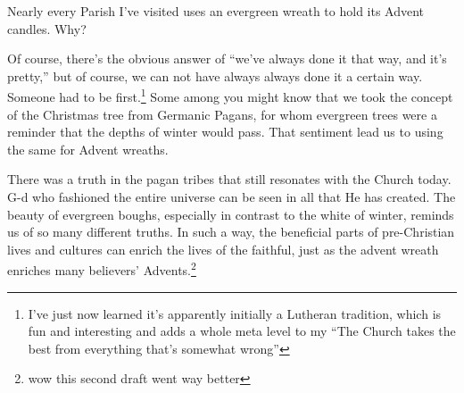 \documentclass[12pt]{article}[titlepage]
\newcommand{\say}[1]{``#1''}
\newcommand{\1}{\={a}}
\newcommand{\2}{\={e}}
\newcommand{\3}{\={\i}}
\newcommand{\4}{\=o}
\newcommand{\5}{\=u}
\newcommand{\6}{\={A}}
\renewcommand{\,}{\textsuperscript{,}}
\begin{document}
Nearly every Parish I've visited uses an evergreen wreath to hold its Advent candles.
Why?

Of course, there's the obvious answer of \say{we've always done it that way, and it's pretty,} but of course, we can not have always always done it a certain way.
Someone had to be first.\footnote{I've just now learned it's apparently initially a Lutheran tradition, which is fun and interesting and adds a whole meta level to my \say{The Church takes the best from everything that's somewhat wrong}}
Some among you might know that we took the concept of the Christmas tree from Germanic Pagans, for whom evergreen trees were a reminder that the depths of winter would pass.
That sentiment lead us to using the same for Advent wreaths.

There was a truth in the pagan tribes that still resonates with the Church today.
G-d who fashioned the entire universe can be seen in all that He has created.
The beauty of evergreen boughs, especially in contrast to the white of winter, reminds us of so many different truths.
In such a way, the beneficial parts of pre-Christian lives and cultures can enrich the lives of the faithful, just as the advent wreath enriches many believers' Advents.\footnote{wow this second draft went way better}
\end{document}
